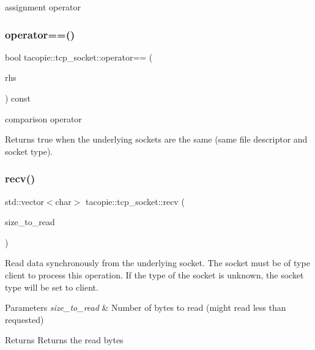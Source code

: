 assignment operator 

\mbox{\label{classtacopie_1_1tcp__socket_a69fde61058ab72d88ce48f557d8216cf}} 
\subsubsection{\texorpdfstring{operator==()}{operator==()}}
{\footnotesize\ttfamily bool tacopie\+::tcp\+\_\+socket\+::operator== (\begin{DoxyParamCaption}\item[{const \hyperlink{classtacopie_1_1tcp__socket}{tcp\+\_\+socket} \&}]{rhs }\end{DoxyParamCaption}) const}

comparison operator

\begin{DoxyReturn}{Returns}
true when the underlying sockets are the same (same file descriptor and socket type). 
\end{DoxyReturn}
\mbox{\label{classtacopie_1_1tcp__socket_a0d6d30258a902d12b3c2c62644756685}} 
\subsubsection{\texorpdfstring{recv()}{recv()}}
{\footnotesize\ttfamily std\+::vector$<$char$>$ tacopie\+::tcp\+\_\+socket\+::recv (\begin{DoxyParamCaption}\item[{std\+::size\+\_\+t}]{size\+\_\+to\+\_\+read }\end{DoxyParamCaption})}

Read data synchronously from the underlying socket. The socket must be of type client to process this operation. If the type of the socket is unknown, the socket type will be set to client.


\begin{DoxyParams}{Parameters}
{\em size\+\_\+to\+\_\+read} & Number of bytes to read (might read less than requested) \\
\hline
\end{DoxyParams}
\begin{DoxyReturn}{Returns}
Returns the read bytes 
\end{DoxyReturn}
\mbox{\label{classtacopie_1_1tcp__socket_a36521a8f502adc665ad0fb1c53583d04}} 
